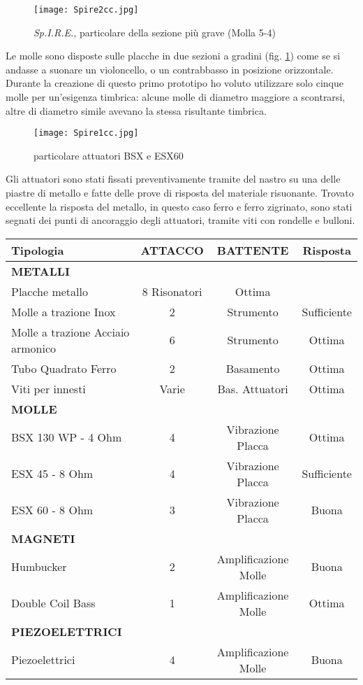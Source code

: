 \begin{figure}[htbp]
\begin{center}
\texttt{[image: Spire2cc.jpg]}
\caption{\textit{Sp.I.R.E.}, particolare della sezione più grave (Molla 5-4)}
\label{fig:partgrave}
\end{center}
\end{figure}

Le molle sono disposte sulle placche in due sezioni a gradini (fig. \ref{fig:partgrave}) come se si andasse a suonare un violoncello, o un contrabbasso in posizione orizzontale. Durante la creazione di questo primo prototipo ho voluto utilizzare solo cinque molle per un'esigenza timbrica: alcune molle di diametro maggiore a scontrarsi, altre di diametro simile avevano la stessa risultante timbrica. 

\begin{figure}[t]
\begin{center}
\texttt{[image: Spire1cc.jpg]}
\caption{particolare attuatori BSX e ESX60}
\label{fig:partattua}
\end{center}
\end{figure}

Gli attuatori sono stati fissati preventivamente tramite del nastro su una delle piastre di metallo e fatte delle prove di risposta del materiale risuonante. Trovato eccellente la risposta del metallo, in questo caso ferro e ferro zigrinato, sono stati segnati dei punti di ancoraggio degli attuatori, tramite viti con rondelle e bulloni.

\clearpage 

\begin{tabularx}{\textwidth}{Xccc}
\toprule
\textbf{Tipologia} & \textbf{ATTACCO} & \textbf{BATTENTE} & \textbf{Risposta} \\
\midrule \textbf{METALLI} & & & \\
\midrule 
Placche metallo & 8 Risonatori & Ottima \\
\midrule 
Molle a trazione Inox & 2 & Strumento & Sufficiente \\
\midrule 
Molle a trazione Acciaio armonico & 6 & Strumento & Ottima\\
\midrule 
Tubo Quadrato Ferro & 2 & Basamento & Ottima\\
\midrule 
Viti per innesti & Varie & Bas. Attuatori & Ottima\\
\midrule 
\textbf{MOLLE}\\
\midrule 
BSX 130 WP - 4 Ohm & 4 & Vibrazione Placca & Ottima\\
\midrule 
ESX 45 - 8 Ohm & 4 & Vibrazione Placca & Sufficiente\\
\midrule 
ESX 60 - 8 Ohm & 3 & Vibrazione Placca & Buona\\
\midrule 
\textbf{MAGNETI}\\
\midrule 
Humbucker & 2 & Amplificazione Molle & Buona\\
\midrule 
Double Coil Bass & 1 & Amplificazione Molle & Ottima\\
\midrule 
\textbf{PIEZOELETTRICI} \\
\midrule 
Piezoelettrici & 4 & Amplificazione Molle & Buona\\
\bottomrule
\end{tabularx}

